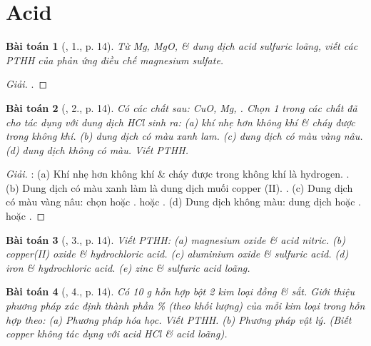 \documentclass{article}
\newtheorem{baitoan}{Bài toán}
\begin{document}

\section{Acid}

\begin{baitoan}[\cite{SGK_Hoa_Hoc_9}, 1., p. 14]
	Từ {\rm Mg, MgO, } \& dung dịch acid sulfuric loãng, viết các {\rm PTHH} của phản ứng điều chế magnesium sulfate.
\end{baitoan}

\begin{proof}[Giải]
	.
\end{proof}

\begin{baitoan}[\cite{SGK_Hoa_Hoc_9}, 2., p. 14]
	Có các chất sau: {\rm CuO, Mg, }. Chọn 1 trong các chất đã cho tác dụng với dung dịch {\rm HCl} sinh ra: (a) khí nhẹ hơn không khí \& cháy được trong không khí. (b) dung dịch có màu xanh lam. (c) dung dịch có màu vàng nâu. (d) dung dịch không có màu. Viết {\rm PTHH}.
\end{baitoan}

\begin{proof}[Giải]
	\cite{Ninh_giai_BT_Hoa_Hoc_9}: (a) Khí nhẹ hơn không khí \& cháy được trong không khí là hydrogen. . (b) Dung dịch có màu xanh làm là dung dịch muối copper (II). . (c) Dung dịch có màu vàng nâu: chọn  hoặc .  hoặc . (d) Dung dịch không màu: dung dịch  hoặc .  hoặc .
\end{proof}

\begin{baitoan}[\cite{SGK_Hoa_Hoc_9}, 3., p. 14]
	Viết {\rm PTHH}: (a) magnesium oxide \& acid nitric. (b) copper(II) oxide \& hydrochloric acid. (c) aluminium oxide \& sulfuric acid. (d) iron \& hydrochloric acid. (e) zinc \& sulfuric acid loãng.
\end{baitoan}

\begin{baitoan}[\cite{SGK_Hoa_Hoc_9}, 4., p. 14]
	Có {\rm10 g} hỗn hợp bột 2 kim loại đồng \& sắt. Giới thiệu phương pháp xác định thành phần \% (theo khối lượng) của mỗi kim loại trong hỗn hợp theo: (a) Phương pháp hóa học. Viết PTHH. (b) Phương pháp vật lý. (Biết copper không tác dụng với acid {\rm HCl} \& acid {\rm{}} loãng).
\end{baitoan}
\end{document}
